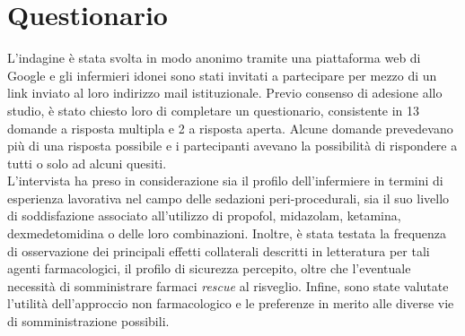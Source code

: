 
\vfill

\section{Questionario}

L'indagine è stata svolta in modo anonimo tramite una piattaforma web di Google e gli infermieri idonei sono stati invitati a partecipare per mezzo di un link inviato al loro indirizzo mail istituzionale. Previo consenso di adesione allo studio, è stato chiesto loro di completare un questionario, consistente in 13 domande a risposta multipla e 2 a risposta aperta. Alcune domande prevedevano più di una risposta possibile e i partecipanti avevano la possibilità di rispondere a tutti o solo ad alcuni quesiti. 
\\L'intervista ha preso in considerazione sia il profilo dell'infermiere in termini di esperienza lavorativa nel campo delle sedazioni peri-procedurali, sia il suo livello di soddisfazione associato all'utilizzo di propofol, midazolam, ketamina, dexmedetomidina o delle loro combinazioni. Inoltre, è stata testata la frequenza di osservazione dei principali effetti collaterali descritti in letteratura per tali agenti farmacologici, il profilo di sicurezza percepito, oltre che l'eventuale necessità di somministrare farmaci \emph{rescue} al risveglio. Infine, sono state valutate l'utilità dell'approccio non farmacologico e le preferenze in merito alle diverse vie di somministrazione possibili. 

\vfill
    

